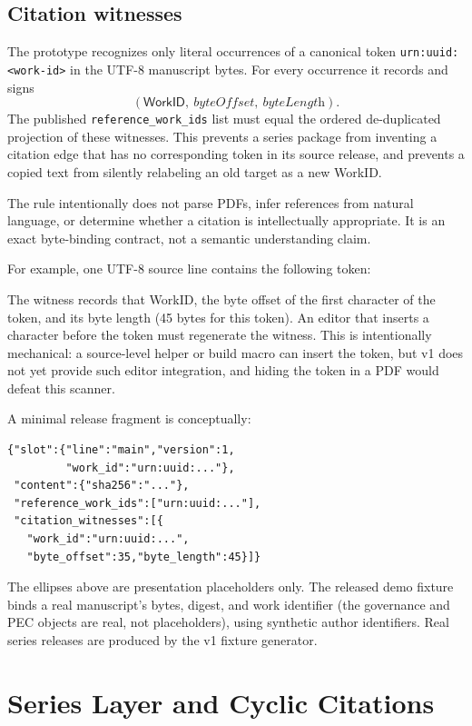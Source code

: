 \documentclass[conference,compsoc]{IEEEtran}
\newcommand{\workid}{\textsf{WorkID}}
\begin{document}
\subsection{Citation witnesses}

The prototype recognizes only literal occurrences of a canonical token \texttt{urn:uuid:<work-id>} in the UTF-8 manuscript bytes. For every occurrence it records and signs
\[
  (\workid,\ \textit{byteOffset},\ \textit{byteLength}).
\]
The published \texttt{reference\_work\_ids} list must equal the ordered de-duplicated projection of these witnesses. This prevents a series package from inventing a citation edge that has no corresponding token in its source release, and prevents a copied text from silently relabeling an old target as a new \workid.

The rule intentionally does not parse PDFs, infer references from natural language, or determine whether a citation is intellectually appropriate. It is an exact byte-binding contract, not a semantic understanding claim.

For example, one UTF-8 source line contains the following token:
\begin{center}
\end{center}
The witness records that WorkID, the byte offset of the first character of the
token, and its byte length (45 bytes for this token). An editor that inserts a
character before the token must regenerate the witness. This is intentionally
mechanical: a source-level helper or build macro can insert the token, but v1
does not yet provide such editor integration, and hiding the token in a PDF
would defeat this scanner.

A minimal release fragment is conceptually:
\begin{verbatim}
{"slot":{"line":"main","version":1,
         "work_id":"urn:uuid:..."},
 "content":{"sha256":"..."},
 "reference_work_ids":["urn:uuid:..."],
 "citation_witnesses":[{
   "work_id":"urn:uuid:...",
   "byte_offset":35,"byte_length":45}]}
\end{verbatim}
The ellipses above are presentation placeholders only. The released demo
fixture binds a real manuscript's bytes, digest, and work identifier (the
governance and PEC objects are real, not placeholders), using synthetic author
identifiers. Real series releases are produced by the v1 fixture generator.

\section{Series Layer and Cyclic Citations}
\end{document}
